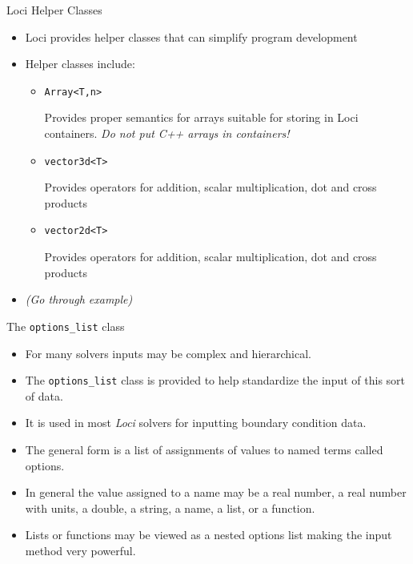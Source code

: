 \documentclass{beamer}
\begin{document}
\begin{frame}{Loci Helper Classes}
\begin{itemize}
\item Loci provides helper classes that can simplify program development
\item Helper classes include:
\begin{itemize}
  \item {\tt Array<T,n>}

    Provides proper semantics for arrays suitable for storing in Loci containers. {\it Do not put C++ arrays in containers!}
  \item {\tt vector3d<T> }

    Provides operators for addition, scalar multiplication, dot and cross products
  \item {\tt vector2d<T> }

    Provides operators for addition, scalar multiplication, dot and cross products
\end{itemize}
\item {\it (Go through example)}
\end{itemize}
\end{frame}
\begin{frame}{The {\tt options\_list} class}
\begin{itemize}
\item For many solvers inputs may be complex and hierarchical.
\item The {\tt options\_list} class is provided to help standardize the input of this sort of data.
\item It is used in most {\it Loci} solvers for inputting boundary condition data.  
\item The general form is a list of assignments of values to named terms called options.
\item In general the value assigned to a name may be a real number, a real number with units, a double, a string, a name, a list, or a function.  
\item Lists or functions may be viewed as a nested options list making the input method very powerful.
\end{itemize}
\end{frame}
\end{document}
